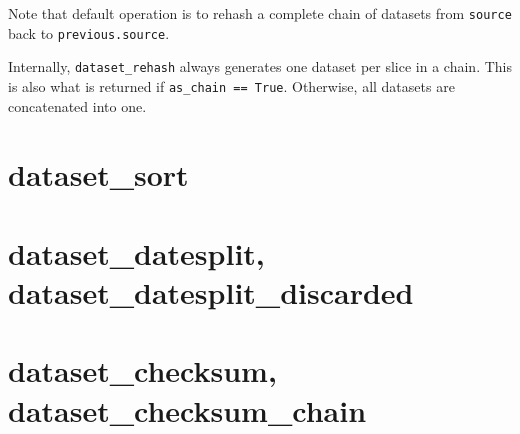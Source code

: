 \noindent Note that default operation is to rehash a complete chain of
datasets from \texttt{source} back to \texttt{previous.source}.

Internally, \texttt{dataset\_rehash} always generates one dataset per
slice in a chain.  This is also what is returned if \texttt{as\_chain
  == True}.  Otherwise, all datasets are concatenated into one.

\clearpage
\section{dataset\_sort}

\clearpage
\section{dataset\_datesplit, dataset\_datesplit\_discarded}

\clearpage
\section{dataset\_checksum, dataset\_checksum\_chain}


